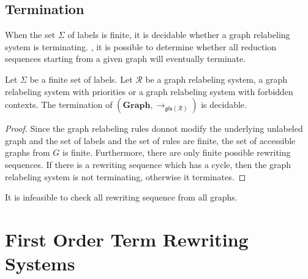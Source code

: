       
       
    \section{Termination}
    \color{red}
      When the set $\Sigma$ of labels is finite, it is decidable whether a graph relabeling system is terminating.
    , it is possible to determine whether all reduction sequences starting from a given graph will eventually terminate. 
    
    \begin{proposition}
      Let $\Sigma$ be a finite set of labels.  Let $\mathcal{R}$ be a graph relabeling system, a graph relabeling system with priorities or a graph relabeling system with forbidden contexts. The termination of $(\textbf{Graph}, \to_{\mathfrak{gls(\mathcal{R})}})$ is decidable.
      \end{proposition}
      \begin{proof}
         Since the graph relabeling rules donnot modify the underlying unlabeled graph and the set of labels and the set of rules are finite, the set of accessible graphs from $G$ is finite. Furthermore, there are only finite possible rewriting sequences. If there is a rewriting sequence which has a cycle, then the graph relabeling system is not terminating, otherwise it terminates.
      \end{proof}
    
    \begin{remark}
      It is infeasible to check all rewriting sequence from all graphs.
    \end{remark}
    \color{black}

\chapter{First Order Term Rewriting Systems}
    \label{sec:trs} 
    
